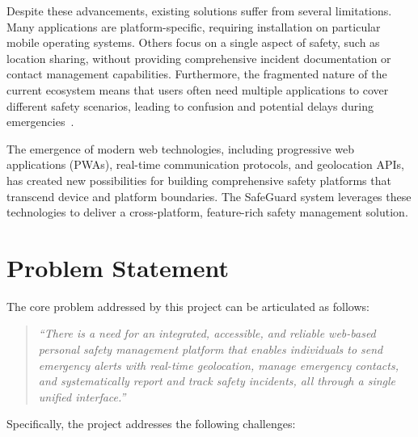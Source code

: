 Despite these advancements, existing solutions suffer from several limitations. Many applications are platform-specific, requiring installation on particular mobile operating systems. Others focus on a single aspect of safety, such as location sharing, without providing comprehensive incident documentation or contact management capabilities. Furthermore, the fragmented nature of the current ecosystem means that users often need multiple applications to cover different safety scenarios, leading to confusion and potential delays during emergencies~\cite{b2021smart}.

The emergence of modern web technologies, including progressive web applications (PWAs), real-time communication protocols, and geolocation APIs, has created new possibilities for building comprehensive safety platforms that transcend device and platform boundaries. The SafeGuard system leverages these technologies to deliver a cross-platform, feature-rich safety management solution.

\section{Problem Statement}

The core problem addressed by this project can be articulated as follows:

\begin{quote}
  \textit{``There is a need for an integrated, accessible, and reliable web-based personal safety management platform that enables individuals to send emergency alerts with real-time geolocation, manage emergency contacts, and systematically report and track safety incidents, all through a single unified interface.''}
\end{quote}

Specifically, the project addresses the following challenges:

